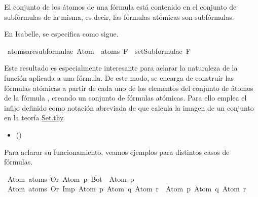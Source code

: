 \begin{isabellebody}
\begin{isamarkuptext}
 \begin{lema}
    El conjunto de los átomos de una fórmula está contenido en el conjunto de subfórmulas de la 
    misma, es decir, las fórmulas atómicas son subfórmulas.
  \end{lema}

En Isabelle, se especifica como sigue.%
\end{isamarkuptext}\isamarkuptrue%
\isamarkupfalse%
\ atoms{\isacharunderscore}are{\isacharunderscore}subformulae{\isacharcolon}\ {\isachardoublequoteopen}Atom\ {\isacharbackquote}\ atoms\ F\ {\isasymsubseteq}\ setSubformulae\ F{\isachardoublequoteclose}\isanewline
%
\isadelimproof
\ \ %
\endisadelimproof
%
\isatagproof
{}\isamarkupfalse%
%
\endisatagproof
{\isafoldproof}%
%
\isadelimproof
%
\endisadelimproof
%
\begin{isamarkuptext}%
Este resultado es especialmente interesante para aclarar la naturaleza de la función 
 aplicada a una fórmula. De este modo,  se encarga de 
construir las fórmulas atómicas a partir de cada uno de los elementos del conjunto de átomos de la fórmula , 
creando un conjunto de fórmulas atómicas. Para ello emplea el infijo \isa{{\isacharbackquote}} definido como notación
abreviada de \isa{{\isacharparenleft}{\isacharbackquote}{\isacharparenright}} que calcula la imagen de un conjunto en la teoría \href{https://n9.cl/qatp}{Set.thy}.
 \begin{itemize}
  \item[]  \hfill ()
  \end{itemize}
Para aclarar su funcionamiento, veamos ejemplos para distintos casos de fórmulas.%
\end{isamarkuptext}\isamarkuptrue%
\isamarkupfalse%
\ {\isachardoublequoteopen}Atom\ {\isacharbackquote}atoms\ {\isacharparenleft}Or\ {\isacharparenleft}Atom\ p{\isacharparenright}\ Bot{\isacharparenright}\ {\isacharequal}\ {\isacharbraceleft}Atom\ p{\isacharbraceright}{\isachardoublequoteclose}\isanewline
\isanewline
{}\isamarkupfalse%
\ {\isachardoublequoteopen}Atom\ {\isacharbackquote}atoms\ {\isacharparenleft}Or\ {\isacharparenleft}Imp\ {\isacharparenleft}Atom\ p{\isacharparenright}\ {\isacharparenleft}Atom\ q{\isacharparenright}{\isacharparenright}\ {\isacharparenleft}Atom\ r{\isacharparenright}{\isacharparenright}\ {\isacharequal}\ {\isacharbraceleft}Atom\ p{\isacharcomma}\ Atom\ q{\isacharcomma}\ Atom\ r{\isacharbraceright}{\isachardoublequoteclose}\isanewline

\end{isabellebody}
